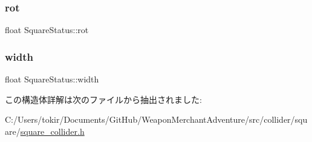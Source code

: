 \mbox{\label{struct_square_status_aa3a8763adac80250eaaa0f2ed4e33a36}} 
\subsubsection{\texorpdfstring{rot}{rot}}
{\footnotesize\ttfamily float Square\+Status\+::rot}

\mbox{\label{struct_square_status_ad3da51c76a64f335e2401a333ed7a29c}} 
\subsubsection{\texorpdfstring{width}{width}}
{\footnotesize\ttfamily float Square\+Status\+::width}



この構造体詳解は次のファイルから抽出されました\+:\begin{DoxyCompactItemize}
\item 
C\+:/\+Users/tokir/\+Documents/\+Git\+Hub/\+Weapon\+Merchant\+Adventure/src/collider/square/\mbox{\hyperlink{square__collider_8h}{square\+\_\+collider.\+h}}\end{DoxyCompactItemize}
